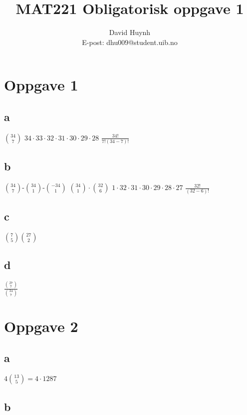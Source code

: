 \documentclass{article}
\begin{document}
\title{MAT221 Obligatorisk oppgave 1}
\author{David Huynh\\E-post: dhu009@student.uib.no}
\maketitle

\section*{Oppgave 1}

\subsection*{a}

$34 \choose 7$
$34 \cdotp 33 \cdotp 32 \cdotp 31 \cdotp 30 \cdotp 29 \cdotp 28$
$\frac{34!}{7!(34-7)!}$

\subsection*{b}

$34 \choose 7$-$34 \choose 1$-$- 34 \choose 1$
${34 \choose 1} \cdotp {32 \choose 6}$
$1 \cdotp 32 \cdotp 31 \cdotp 30 \cdotp 29 \cdotp 28 \cdotp 27$
$\frac{32!}{(32-6)!}$

\subsection*{c}

$7 \choose 5$$27 \choose 2$

\subsection*{d}

$\frac{{27 \choose 7}}{{34 \choose 7}}$

\section*{Oppgave 2}

\subsection*{a}
$4{13 \choose 5}=4 \cdotp 1287$

\subsection*{b}
\end{document}
